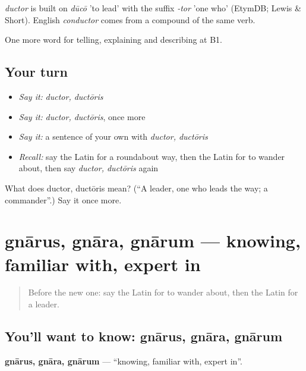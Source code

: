 \begin{cousinweb}
\emph{ductor} is built on \emph{dūcō} 'to lead' with the suffix \emph{-tor} 'one who' (EtymDB; Lewis \& Short). English \emph{conductor} comes from a compound of the same verb.
\end{cousinweb}

\begin{grammarlens}[title={What you've built}]
One more word for telling, explaining and describing at B1.
\end{grammarlens}

\subsection*{Your turn}
\begin{itemize}
\raggedright
  \item \emph{Say it:} \emph{ductor, ductōris}
  \item \emph{Say it:} \emph{ductor, ductōris}, once more
  \item \emph{Say it:} a sentence of your own with \emph{ductor, ductōris}
  \item \emph{Recall:} say the Latin for a roundabout way, then the Latin for to wander about, then say \emph{ductor, ductōris} again
\end{itemize}

\begin{tcolorbox}[breakable,colback=teal!4,colframe=teal!35!black,title={Before you move on}]
What does ductor, ductōris mean? (\textquotedblleft{}A leader, one who leads the way; a commander\textquotedblright{}.) Say it once more.
\end{tcolorbox}
\section[gnārus, gnāra, gnārum]{gnārus, gnāra, gnārum — knowing, familiar with, expert in}

\label{lesson:LA-C453-gnarus}



\begin{quote}
Before the new one: say the Latin for to wander about, then the Latin for a leader.
\end{quote}

\subsection*{You'll want to know: gnārus, gnāra, gnārum}
\textbf{gnārus, gnāra, gnārum} — \textquotedblleft{}knowing, familiar with, expert in\textquotedblright{}.

